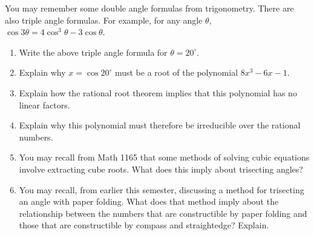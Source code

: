 \documentclass[nooutcomes]{ximera}
\begin{document}
\begin{problem}
You may remember some double angle formulas from trigonometry.  There are also triple angle formulas.  For example, for any angle $\theta$,  
$\cos3\theta=4\cos^3\theta -3\cos\theta$.  
\begin{enumerate}
\item Write the above triple angle formula for $\theta = 20^\circ$.  %
\item Explain why $x = \cos20^\circ$ must be a root of the polynomial $8x^3-6x-1$.  
\item Explain how the rational root theorem implies that this polynomial has no linear factors.  
\item Explain why this polynomial must therefore be irreducible over the rational numbers.  
\item You may recall from Math 1165 that some methods of solving cubic equations involve extracting cube roots.  What does this imply about trisecting angles?  
\item You may recall, from earlier this semester, discussing a method for trisecting an angle with paper folding.  What does that method imply about the relationship between the numbers that are constructible by paper folding and those that are constructible by compass and straightedge?  Explain.  
\end{enumerate}
\end{problem}
\end{document}
